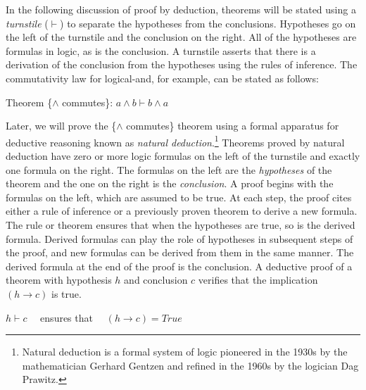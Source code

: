 In the following discussion of proof by deduction,
theorems will be stated using a
\emph{turnstile} ($\vdash$)
to separate the hypotheses
from the conclusions.
Hypotheses go on the left of the turnstile and the conclusion on the right.
All of the hypotheses are formulas in logic, as is the conclusion.
A turnstile asserts that there is a derivation of the conclusion
from the hypotheses using the rules of inference.
The commutativity law for logical-and, for example,
can be stated as follows:
\begin{center}
Theorem \{$\wedge$ commutes\}: $a \wedge b \vdash b \wedge a$
\end{center}

Later, we will prove the \{$\wedge$ commutes\} theorem using a formal apparatus
for deductive reasoning known as
\emph{natural deduction}.\footnote{Natural
deduction is a formal system of logic pioneered in the 1930s
by the mathematician Gerhard Gentzen and refined in the 1960s
by the logician Dag Prawitz.}
Theorems proved by natural deduction have zero or more
logic formulas on the left of the turnstile and exactly one formula on the right.
The formulas on the left are the \emph{hypotheses} of the theorem and
the one on the right is the \emph{conclusion}.
A proof begins with the formulas on the left,
which are assumed to be true.
At each step, the proof cites either a rule of inference or a previously proven theorem
to derive a new formula. The rule or theorem ensures that when the hypotheses are true,
so is the derived formula. Derived formulas can play the role of hypotheses
in subsequent steps of the proof, and new formulas can be derived from them
in the same manner. The derived formula at the end of the proof is the conclusion.
A deductive proof of a theorem with hypothesis $h$ and conclusion $c$
verifies that the implication $(h \rightarrow c)$ is true.
\begin{center}
$h \vdash c$ ~~ensures that~~ $(h \rightarrow c) = True$
\end{center}

